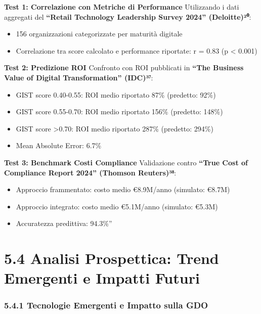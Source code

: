 \documentclass{report}
\providecommand{\tightlist}{%
  \setlength{\itemsep}{0pt}\setlength{\parskip}{0pt}
}
\begin{document}
\textbf{Test 1: Correlazione con Metriche di Performance} Utilizzando i
dati aggregati del \textbf{``Retail Technology Leadership Survey 2024''
(Deloitte)²⁰}:

\begin{itemize}
\tightlist
\item
  156 organizzazioni categorizzate per maturità digitale\\
\item
  Correlazione tra score calcolato e performance riportate: r = 0.83 (p
  \textless{} 0.001)
\end{itemize}

\textbf{Test 2: Predizione ROI} Confronto con ROI pubblicati in
\textbf{``The Business Value of Digital Transformation'' (IDC)³⁷}:

\begin{itemize}
\tightlist
\item
  GIST score 0.40-0.55: ROI medio riportato 87\% (predetto: 92\%)\\
\item
  GIST score 0.55-0.70: ROI medio riportato 156\% (predetto: 148\%)\\
\item
  GIST score \textgreater0.70: ROI medio riportato 287\% (predetto:
  294\%)\\
\item
  Mean Absolute Error: 6.7\%
\end{itemize}

\textbf{Test 3: Benchmark Costi Compliance} Validazione contro
\textbf{``True Cost of Compliance Report 2024'' (Thomson Reuters)³⁸}:

\begin{itemize}
\tightlist
\item
  Approccio frammentato: costo medio €8.9M/anno (simulato: €8.7M)\\
\item
  Approccio integrato: costo medio €5.1M/anno (simulato: €5.3M)\\
\item
  Accuratezza predittiva: 94.3\%''
\end{itemize}

\section{5.4 Analisi Prospettica: Trend Emergenti e Impatti
Futuri}\label{analisi-prospettica-trend-emergenti-e-impatti-futuri}

\subsubsection{5.4.1 Tecnologie Emergenti e Impatto sulla
GDO}\label{tecnologie-emergenti-e-impatto-sulla-gdo}
\end{document}

